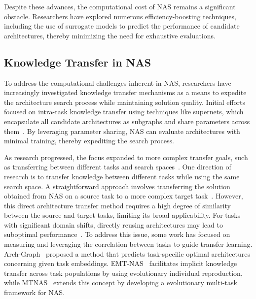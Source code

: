\documentclass[../main.tex]{subfiles}
\begin{document}
Despite these advances, the computational cost of NAS remains a significant obstacle. Researchers have explored numerous efficiency-boosting techniques, including the use of surrogate models to predict the performance of candidate architectures, thereby minimizing the need for exhaustive evaluations.


\subsection{Knowledge Transfer in NAS}

To address the computational challenges inherent in NAS, researchers have increasingly investigated knowledge transfer mechanisms as a means to expedite the architecture search process while maintaining solution quality.
Initial efforts focused on intra-task knowledge transfer using techniques like supernets, which encapsulate all candidate architectures as subgraphs and share parameters across them~\cite{DBLP:conf/cvpr/ZophVSL18,pham_efficient_2018,Huang2023SplitLevelEN}.
By leveraging parameter sharing, NAS can evaluate architectures with minimal training, thereby expediting the search process.

As research progressed, the focus expanded to more complex transfer goals, such as transferring between different tasks and search spaces~\cite{DBLP:conf/cvpr/ZophVSL18}.
One direction of research is to transfer knowledge between different tasks while using the same search space.
A straightforward approach involves transferring the solution obtained from NAS on a source task to a more complex target task~\cite{DBLP:conf/cvpr/ZophVSL18,DBLP:conf/iclr/LiuSY19}.
However, this direct architecture transfer method requires a high degree of similarity between the source and target tasks, limiting its broad applicability.
For tasks with significant domain shifts, directly reusing architectures may lead to suboptimal performance~\cite{DBLP:conf/iclr/LiuSY19}.
To address this issue, some work has focused on measuring and leveraging the correlation between tasks to guide transfer learning.
Arch-Graph~\cite{DBLP:conf/cvpr/HuangHLCXLL22} proposed a method that predicts task-specific optimal architectures concerning given task embeddings.
EMT-NAS~\cite{DBLP:conf/cvpr/LiaoJD23} facilitates implicit knowledge transfer across task populations by using evolutionary individual reproduction, while MTNAS~\cite{DBLP:journals/tec/ZhouWFLWT24} extends this concept by developing a evolutionary multi-task framework for NAS\@.
\end{document}
